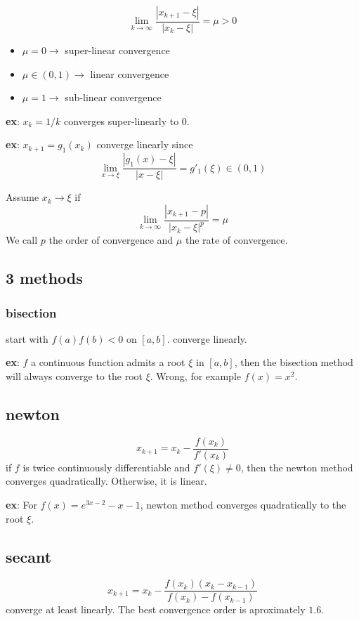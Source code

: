 \documentclass{article}%
\begin{document}
$$
\lim _{k \rightarrow \infty} \frac{\left|x_{k+1}-\xi\right|}{\left|x_k-\xi\right|}=\mu>0
$$
\begin{itemize}
    \item $\mu=0 \rightarrow$ super-linear convergence
    \item $\mu \in(0,1) \rightarrow$ linear convergence
    \item $\mu=1 \rightarrow$ sub-linear convergence
\end{itemize}

\textbf{ex}: $x_k=1/k$ converges super-linearly to 0.

\textbf{ex}:  $x_{k+1}=g_1(x_k)$ converge linearly since
$$
\lim_{x\rightarrow \xi}\frac{\left|g_1(x)-\xi\right|}{\left|x-\xi\right|}=g'_1(\xi)\in(0,1)
$$

Assume $x_k\rightarrow \xi$ if 
$$\lim_{k\rightarrow\infty}\frac{|x_{k+1}-p|}{|x_k-\xi|^p}=\mu$$
We call $p$ the order of convergence and $\mu$ the rate of convergence.

\subsection{3 methods}
\subsubsection{bisection}
start with $f(a) f(b)<0$ on $[a,b]$.  converge linearly.

\textbf{ex}: $f$ a continuous function admits a root $\xi$ in $[a,b]$, then the bisection method will always converge to the root $\xi$. Wrong, for example $f(x)=x^2$.

\subsection{newton}
$$x_{k+1}=x_k-\frac{f(x_k)}{f'(x_k)}$$
if $f$ is twice continuously differentiable and $f'(\xi)\neq 0$, then the newton method converges quadratically. Otherwise, it is linear.

\textbf{ex}: For $f(x)=e^{3x-2}-x-1$, newton method converges quadratically to the root $\xi$.

\subsection{secant}
$$x_{k+1}=x_k-\frac{f(x_k)(x_k-x_{k-1})}{f(x_k)-f(x_{k-1})}$$
converge at least linearly. The best convergence order is aproximately $1.6$.
\end{document}
